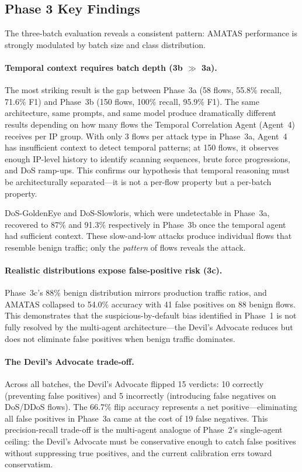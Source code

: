 \documentclass[12pt, a4paper, oneside]{report}
\begin{document}
\subsection{Phase 3 Key Findings}
\label{sec:phase3-findings}

The three-batch evaluation reveals a consistent pattern: AMATAS performance is
strongly modulated by batch size and class distribution.

\paragraph{Temporal context requires batch depth (3b $\gg$ 3a).}
The most striking result is the gap between Phase~3a (58 flows, 55.8\% recall,
71.6\% F1) and Phase~3b (150 flows, 100\% recall, 95.9\% F1). The same
architecture, same prompts, and same model produce dramatically different results
depending on how many flows the Temporal Correlation Agent (Agent~4) receives per
IP group. With only 3 flows per attack type in Phase~3a, Agent~4 has insufficient
context to detect temporal patterns; at 150 flows, it observes enough IP-level
history to identify scanning sequences, brute force progressions, and DoS ramp-ups.
This confirms our hypothesis that temporal reasoning must be architecturally
separated---it is not a per-flow property but a per-batch property.

DoS-GoldenEye and DoS-Slowloris, which were undetectable in Phase~3a, recovered to
87\% and 91.3\% respectively in Phase~3b once the temporal agent had sufficient
context. These slow-and-low attacks produce individual flows that resemble benign
traffic; only the \emph{pattern} of flows reveals the attack.

\paragraph{Realistic distributions expose false-positive risk (3c).}
Phase~3c's 88\% benign distribution mirrors production traffic ratios, and
AMATAS collapsed to 54.0\% accuracy with 41 false positives on 88 benign flows.
This demonstrates that the suspicious-by-default bias identified in Phase~1 is
not fully resolved by the multi-agent architecture---the Devil's Advocate reduces
but does not eliminate false positives when benign traffic dominates.

\paragraph{The Devil's Advocate trade-off.}
Across all batches, the Devil's Advocate flipped 15 verdicts: 10 correctly
(preventing false positives) and 5 incorrectly (introducing false negatives on
DoS/DDoS flows). The 66.7\% flip accuracy represents a net positive---eliminating
all false positives in Phase~3a came at the cost of 19 false negatives. This
precision-recall trade-off is the multi-agent analogue of Phase~2's single-agent
ceiling: the Devil's Advocate must be conservative enough to catch false positives
without suppressing true positives, and the current calibration errs toward
conservatism.
\end{document}
